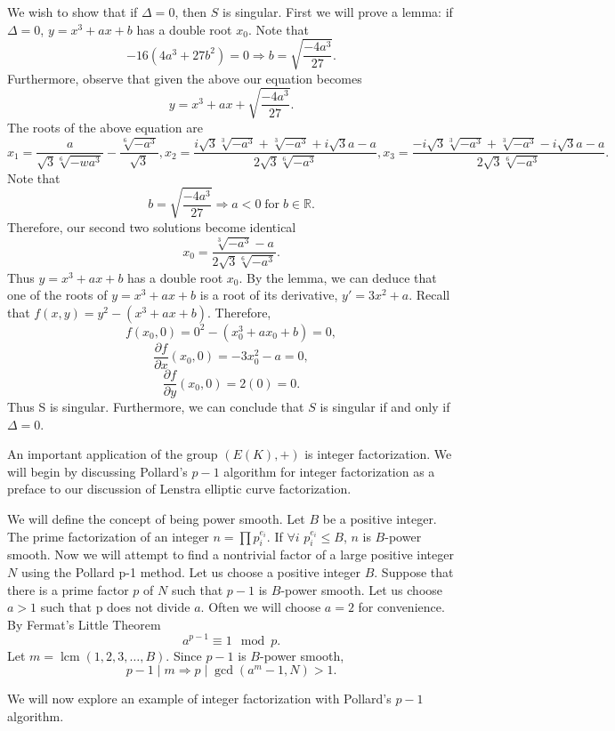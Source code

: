 \documentclass{article}
\DeclareMathOperator{\for}{for}
\DeclareMathOperator{\lcm}{lcm}
\begin{document}
\indent We wish to show that if $\Delta=0$, then $S$ is singular. First we will prove a lemma: if $\Delta=0$, $y=x^3+ax+b$ has a double root $x_0$. Note that
$$-16(4a^3+27b^2)=0 \Longrightarrow b = \sqrt{\frac{-4a^3}{27}}.$$
Furthermore, observe that given the above our equation becomes
$$y=x^3+ax+\sqrt{\frac{-4a^3}{27}}.$$
The roots of the above equation are
$$x_1=\frac{a}{\sqrt{3}\sqrt[6]{-wa^3}}-\frac{\sqrt[6]{-a^3}}{\sqrt{3}}, x_2=\frac{i\sqrt{3}\sqrt[3]{-a^3}+\sqrt[3]{-a^3}+i\sqrt{3}a-a}{2\sqrt{3}\sqrt[6]{-a^3}}, x_3=\frac{-i\sqrt{3}\sqrt[3]{-a^3}+\sqrt[3]{-a^3}-i\sqrt{3}a-a}{2\sqrt{3}\sqrt[6]{-a^3}}.$$
Note that
$$b=\sqrt{\frac{-4a^3}{27}} \Longrightarrow a<0 \for b \in \mathbb{R}.$$
Therefore, our second two solutions become identical
$$x_0=\frac{\sqrt[3]{-a^3}-a}{2\sqrt{3}\sqrt[6]{-a^3}}.$$
Thus $y=x^3+ax+b$ has a double root $x_0$.
By the lemma, we can deduce that one of the roots of $y=x^3+ax+b$ is a root of its derivative, $y'=3x^2+a$. Recall that $f(x,y)=y^2-(x^3+ax+b)$. Therefore,
$$f(x_0,0)=0^2-(x_0^3+ax_0+b)=0,$$
$$\frac{\partial f}{\partial x} (x_0,0)=-3x_0^2-a=0,$$
$$\frac{\partial f}{\partial y} (x_0,0)=2(0)=0.$$
Thus S is singular. Furthermore, we can conclude that $S$ is singular if and only if $\Delta=0$. 

\indent An important application of the group $(E(K),+)$ is integer factorization. We will begin by discussing Pollard's $p-1$ algorithm for integer factorization as a preface to our discussion of Lenstra elliptic curve factorization.

\indent We will define the concept of being power smooth. Let $B$ be a positive integer. The prime factorization of an integer $n=\prod p_{i}^{e_{i}}$. If $\forall i$ $p_{i}^{e_{i}} \leq B$, $n$ is $B$-power smooth. Now we will attempt to find a nontrivial factor of a large positive integer $N$ using the Pollard p-1 method. Let us choose a positive integer $B$. Suppose that there is a prime factor $p$ of $N$ such that $p-1$ is $B$-power smooth. Let us choose $a > 1$ such that p does not divide $a$. Often we will choose $a=2$ for convenience. By Fermat's Little Theorem 
$$a^{p-1} \equiv 1 \mod p.$$
Let $m = \lcm (1,2,3,\dotso,B)$. Since $p-1$ is $B$-power smooth, 
$$p-1 \mid m \Longrightarrow p \mid \gcd (a^m-1,N) > 1.$$

\indent We will now explore an example of integer factorization with Pollard's $p-1$ algorithm.
\end{document}
